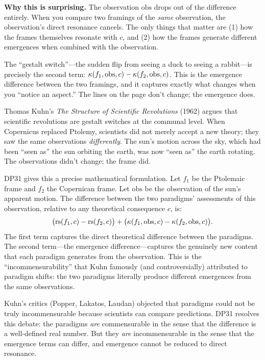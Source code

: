 \begin{surprisebox}
\noindent\textbf{Why this is surprising.}
The observation $\mathrm{obs}$ drops out of the difference entirely.
When you compare two framings of the \emph{same} observation, the
observation's direct resonance cancels.  The only things that matter
are (1) how the frames themselves resonate with $c$, and (2) how
the frames generate different emergences when combined with the
observation.

The ``gestalt switch''---the sudden flip from seeing a duck to
seeing a rabbit---is precisely the second term:
$\kappa(f_1, \mathrm{obs}, c) - \kappa(f_2, \mathrm{obs}, c)$.
This is the emergence difference between the two framings, and it
captures exactly what changes when you ``notice an aspect.''
The lines on the page don't change; the emergence does.
\end{surprisebox}

\begin{interpretation}
\label{interp:kuhn-paradigm}
Thomas Kuhn's \textit{The Structure of Scientific Revolutions} (1962)
argues that scientific revolutions are gestalt switches at the
communal level.  When Copernicus replaced Ptolemy, scientists did not
merely accept a new theory; they saw the same observations
\emph{differently}.  The sun's motion across the sky, which had been
``seen as'' the sun orbiting the earth, was now ``seen as'' the
earth rotating.  The observations didn't change; the frame did.

DP31 gives this a precise mathematical formulation.  Let $f_1$ be the
Ptolemaic frame and $f_2$ the Copernican frame.  Let $\mathrm{obs}$ be
the observation of the sun's apparent motion.  The difference between
the two paradigms' assessments of this observation, relative to any
theoretical consequence $c$, is:
\[
\bigl(\mathrm{rs}(f_1, c) - \mathrm{rs}(f_2, c)\bigr) +
\bigl(\kappa(f_1, \mathrm{obs}, c) - \kappa(f_2, \mathrm{obs}, c)\bigr).
\]
The first term captures the direct theoretical difference between the
paradigms.  The second term---the emergence difference---captures the
genuinely new content that each paradigm generates from the observation.
This is the ``incommensurability'' that Kuhn famously (and controversially)
attributed to paradigm shifts: the two paradigms literally produce
different emergences from the same observations.

Kuhn's critics (Popper, Lakatos, Laudan) objected that paradigms could
not be truly incommensurable because scientists can compare predictions.
DP31 resolves this debate: the paradigms \emph{are} commensurable in
the sense that the difference is a well-defined real number.  But they
\emph{are} incommensurable in the sense that the emergence terms can
differ, and emergence cannot be reduced to direct resonance.
\end{interpretation}

